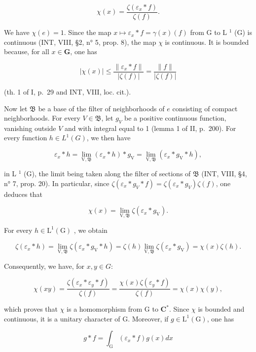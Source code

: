 \[
\chi (x) = \frac {\zeta (\varepsilon_ {x} * f)}{\zeta (f)}.\tag{3}
\]

We have \(\chi(e) = 1\). Since the map \(x \mapsto \varepsilon_x * f = \gamma(x)(f)\) from G to L \(^1\) (G) is continuous (INT, VIII, §2, n° 5, prop. 8), the map \(\chi\) is continuous. It is bounded because, for all \(x \in \mathbf{G}\), one has

\[
| \chi (x) | \leqslant \frac {\| \varepsilon_ {x} * f \|}{| \zeta (f) |} = \frac {\| f \|}{| \zeta (f) |}
\]

(th. 1 of I, p.~29 and INT, VIII, loc. cit.).

Now let \(\mathfrak{B}\) be a base of the filter of neighborhoods of \(e\) consisting of compact neighborhoods. For every \(V \in \mathfrak{B}\), let \(g_V\) be a positive continuous function, vanishing outside \(V\) and with integral equal to 1 (lemma 1 of II, p.~200). For every function \(h \in L^1(G)\), we then have

\[
\varepsilon_ {x} * h = \lim _ {\mathrm{V}, \mathfrak {B}} (\varepsilon_ {x} * h) * g _ {\mathrm{V}} = \lim _ {\mathrm{V}, \mathfrak {B}} (\varepsilon_ {x} * g _ {\mathrm{V}} * h),
\]

in L \(^{1}\) (G), the limit being taken along the filter of sections of \(\mathfrak{B}\) (INT, VIII, §4, n° 7, prop. 20). In particular, since \(\zeta(\varepsilon_x * g_V * f) = \zeta(\varepsilon_x * g_V)\zeta(f)\), one deduces that

\[
\chi (x) = \lim _ {\mathrm{V}, \mathfrak {B}} \zeta (\varepsilon_ {x} * g _ {\mathrm{V}}).
\]

For every \(h\in \mathrm{L}^1 (\mathrm{G})\) , we obtain

\[
\zeta (\varepsilon_ {x} * h) = \lim _ {\mathrm{V}, \mathfrak {B}} \zeta (\varepsilon_ {x} * g _ {\mathrm{V}} * h) = \zeta (h) \lim _ {\mathrm{V}, \mathfrak {B}} \zeta (\varepsilon_ {x} * g _ {\mathrm{V}}) = \chi (x) \zeta (h).
\]

Consequently, we have, for \(x, y \in G\):

\[
\chi (x y) = \frac {\zeta (\varepsilon_ {x} * \varepsilon_ {y} * f)}{\zeta (f)} = \frac {\chi (x) \zeta (\varepsilon_ {y} * f)}{\zeta (f)} = \chi (x) \chi (y),
\]

which proves that \(\chi\) is a homomorphism from G to \(\mathbf{C}^*\). Since \(\chi\) is bounded and continuous, it is a unitary character of G. Moreover, if \(g \in \mathrm{L}^{1}(\mathrm{G})\), one has

\[
g * f = \int_ {\mathrm{G}} (\varepsilon_ {x} * f) g (x) d x
\]


